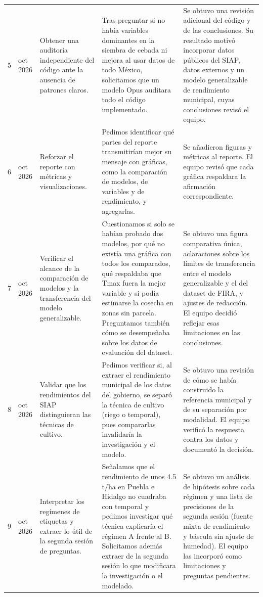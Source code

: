 \documentclass[10pt,letterpaper]{article}
\begin{document}
\begin{longtable}{@{}r >{\raggedright\arraybackslash}p{1.2cm} >{\raggedright\arraybackslash}p{2.7cm} >{\raggedright\arraybackslash}p{4.1cm} >{\raggedright\arraybackslash}p{4.5cm}@{}}
5 & 9 oct 2026 & Obtener una auditoría independiente del código ante la ausencia de patrones claros. & Tras preguntar si no había variables dominantes en la siembra de cebada ni mejora al usar datos de todo México, solicitamos que un modelo Opus auditara todo el código implementado. & Se obtuvo una revisión adicional del código y de las conclusiones. Su resultado motivó incorporar datos públicos del SIAP, datos externos y un modelo generalizable de rendimiento municipal, cuyas conclusiones revisó el equipo. \\
6 & 9 oct 2026 & Reforzar el reporte con métricas y visualizaciones. & Pedimos identificar qué partes del reporte transmitirían mejor su mensaje con gráficas, como la comparación de modelos, de variables y de rendimiento, y agregarlas. & Se añadieron figuras y métricas al reporte. El equipo revisó que cada gráfica respaldara la afirmación correspondiente. \\
7 & 9 oct 2026 & Verificar el alcance de la comparación de modelos y la transferencia del modelo generalizable. & Cuestionamos si solo se habían probado dos modelos, por qué no existía una gráfica con todos los comparados, qué respaldaba que Tmax fuera la mejor variable y si podía estimarse la cosecha en zonas sin parcela. Preguntamos también cómo se desempeñaba sobre los datos de evaluación del dataset. & Se obtuvo una figura comparativa única, aclaraciones sobre los límites de transferencia entre el modelo generalizable y el del dataset de FIRA, y ajustes de redacción. El equipo decidió reflejar esas limitaciones en las conclusiones. \\
8 & 14 oct 2026 & Validar que los rendimientos del SIAP distinguieran las técnicas de cultivo. & Pedimos verificar si, al extraer el rendimiento municipal de los datos del gobierno, se separó la técnica de cultivo (riego o temporal), pues compararlas invalidaría la investigación y el modelo. & Se obtuvo una revisión de cómo se había construido la referencia municipal y de su separación por modalidad. El equipo verificó la respuesta contra los datos y documentó la decisión. \\
9 & 14 oct 2026 & Interpretar los regímenes de etiquetas y extraer lo útil de la segunda sesión de preguntas. & Señalamos que el rendimiento de unos 4.5 t/ha en Puebla e Hidalgo no cuadraba con temporal y pedimos investigar qué técnica explicaría el régimen A frente al B. Solicitamos además extraer de la segunda sesión lo que modificara la investigación o el modelado. & Se obtuvo un análisis de hipótesis sobre cada régimen y una lista de precisiones de la segunda sesión (fuente mixta de rendimiento y báscula sin ajuste de humedad). El equipo las incorporó como limitaciones y preguntas pendientes. \\

\end{longtable}
\end{document}
